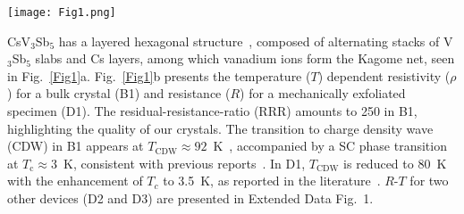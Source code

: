 \documentclass[article,reprint,amsmath,amssymb,superscriptaddress,longbibliography]{revtex4-1}
\begin{document}

\begin{figure*}[thb]
	\begin{center}
		\texttt{[image: Fig1.png]}
	\end{center}
	\setlength{\abovecaptionskip}{-8 pt}
    \caption{\textbf{Zero-field superconducting diode.} \textbf{a}, Crystal structure of CsV$_3$Sb$_5$. \textbf{b}, $T$-dependence of $\rho$ for B1 and $R$ for D1 %
	in the full-$T$ range. The upper inset is the optical image of D1. The lower inset presents the normalized resistance $R/R_\textrm{n}$ around $T_\textrm{c}$, where $R_\textrm{n}$ is the normal state resistance and $T_\textrm{c}$ is the critical temperature determined at zero resistance. \textbf{c}, Differential resistance ($\textrm{d}V/\textrm{d}I$) as a function of d.c. current bias ($I$) at various $T$ for D1. 
	The red and blue curves are collected in positive ($I_\textrm{+}$) and negative ($I_\textrm{-}$) bias regimes, respectively. 
	Curves are offset from each other by 3 $\Omega$ for clarity. \textbf{d}, Enlarged curve of \textbf{c} at $T=0.1$~K. %
	\textbf{e}, $T$-dependence of average critical current ($\bar{I_\textrm{c}}$) and $\Delta I^\textrm{SDE}_\textrm{c}$, where $\bar{I_\textrm{c}}=(I_\textrm{c+}+I_\textrm{c-})/2$ and $\Delta I^\textrm{SDE}_\textrm{c}=I_\textrm{c+}-I_\textrm{c-}$. %
    }
	\label{Fig1}
\end{figure*}

CsV$_3$Sb$_5$ has a layered hexagonal structure~\cite{Toberer2019PRM}, composed of alternating stacks of V$_3$Sb$_5$ slabs and Cs layers, among which vanadium ions form the Kagome net, seen in Fig.~\ref{Fig1}a. Fig.~\ref{Fig1}b presents the temperature ($T$) dependent resistivity ($\rho$) for a bulk crystal (B1) and resistance ($R$) for a mechanically exfoliated specimen (D1). The residual-resistance-ratio (RRR) amounts to 250 in B1, highlighting the quality of our crystals. The transition to charge density wave (CDW) in B1 appears at $T_\textrm{CDW}\approx92$~K~\cite{Toberer2019PRM,Wilson2020PRL}, accompanied by a SC phase transition at $T_\textrm{c}\approx3$~K, consistent with previous reports~\cite{Wilson2020PRL}. In D1, $T_\textrm{CDW}$ is reduced to 80~K with the enhancement of $T_c$ to 3.5~K, 
as reported in the literature~\cite{LiSY2023NC}. $R$-$T$ for two other devices (D2 and D3) are presented in Extended Data Fig.~1. 
\end{document}
